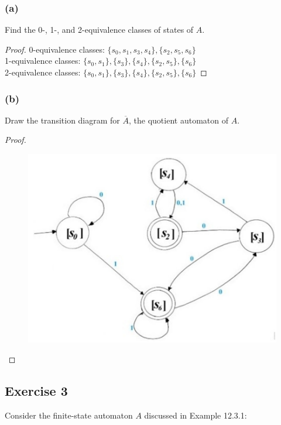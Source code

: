 \documentclass[14pt]{extarticle}
\begin{document}
\subsubsection{(a)}
Find the 0-, 1-, and 2-equivalence classes of states of \(A\).
\begin{proof}
0-equivalence classes: \(\{s_0, s_1, s_3, s_4\}, \{s_2, s_5, s_6\}\) \\
1-equivalence classes: \(\{s_0, s_1\}, \{s_3\}, \{s_4\}, \{s_2, s_5\}, \{s_6\}\) \\
2-equivalence classes: \(\{s_0, s_1\}, \{s_3\}, \{s_4\}, \{s_2, s_5\}, \{s_6\}\)
\end{proof}

\subsubsection{(b)}
Draw the transition diagram for \(\overline{A}\), the quotient automaton of \(A\).

\begin{proof}
\begin{figure}[ht!]
\centering
\includegraphics[scale=0.3]{../images/12.3.2.b.png}
\end{figure}
\end{proof}

\subsection{Exercise 3}
Consider the finite-state automaton \(A\) discussed in Example 12.3.1:
\end{document}
